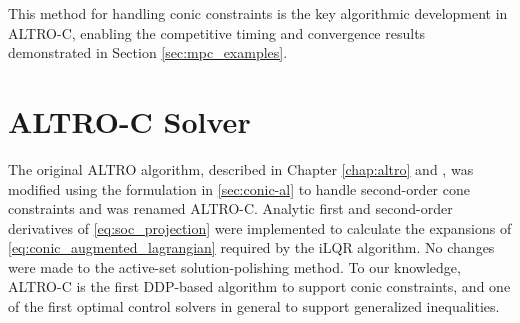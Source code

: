 \documentclass[../root.tex]{subfiles}
\begin{document}
    This method for handling conic constraints is the key algorithmic
    development in ALTRO-C, enabling the competitive timing and convergence
    results demonstrated in Section \ref{sec:mpc_examples}.
    
    
    
    \section{ALTRO-C Solver} 
        
        The original ALTRO algorithm, described in Chapter \ref{chap:altro} and
        \cite{howell_ALTRO_2019}, was modified using the formulation in
        \ref{sec:conic-al} to handle second-order cone constraints and was
        renamed ALTRO-C. Analytic first and second-order derivatives of
        \eqref{eq:soc_projection} were implemented to calculate the
        expansions of \eqref{eq:conic_augmented_lagrangian} required by the
        iLQR algorithm. No changes were made to the active-set
        solution-polishing method. To our knowledge, ALTRO-C is the first
        DDP-based algorithm to support conic constraints, and one of the
        first optimal control solvers in general to support generalized
        inequalities.
\end{document}
